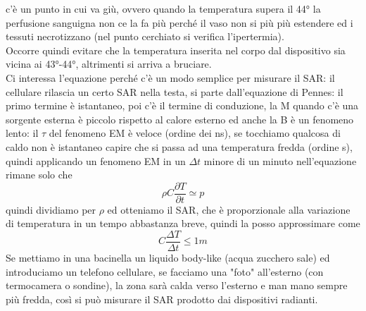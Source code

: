 \documentclass[oneside, 12pt]{extbook}
\begin{document}
c'è un punto in cui va giù, ovvero quando la temperatura supera il 44° la perfusione sanguigna non ce la fa più perché il vaso non si più più estendere ed i tessuti necrotizzano (nel punto cerchiato si verifica l'ipertermia).\\Occorre quindi evitare che la temperatura inserita nel corpo dal dispositivo sia vicina ai 43°-44°, altrimenti si arriva a bruciare.\\Ci interessa l'equazione perché c'è un modo semplice per misurare il SAR: il cellulare rilascia un certo SAR nella testa, si parte dall'equazione di Pennes: il primo termine è istantaneo, poi c'è il termine di conduzione, la M quando c'è una sorgente esterna è piccolo rispetto al calore esterno ed anche la B è un fenomeno lento: il $\tau$ del fenomeno EM è veloce (ordine dei ns), se tocchiamo qualcosa di caldo non è istantaneo capire che si passa ad una temperatura fredda (ordine s), quindi applicando un fenomeno EM in un $\Delta t$ minore di un minuto nell'equazione rimane solo che 
\begin{equation}
	\rho C \frac{\partial T}{\partial t} \simeq p
\end{equation}
quindi dividiamo per $\rho$ ed otteniamo il SAR, che è proporzionale alla variazione di temperatura in un tempo abbastanza breve, quindi la posso approssimare come 
\begin{equation}
	C\frac{\Delta T}{\Delta t} \leq 1m
\end{equation}
Se mettiamo in una bacinella un liquido body-like (acqua zucchero sale) ed introduciamo un telefono cellulare, se facciamo una "foto" all'esterno (con termocamera o sondine), la zona sarà calda verso l'esterno e man mano sempre più fredda, così si può misurare il SAR prodotto dai dispositivi radianti.
\end{document}
